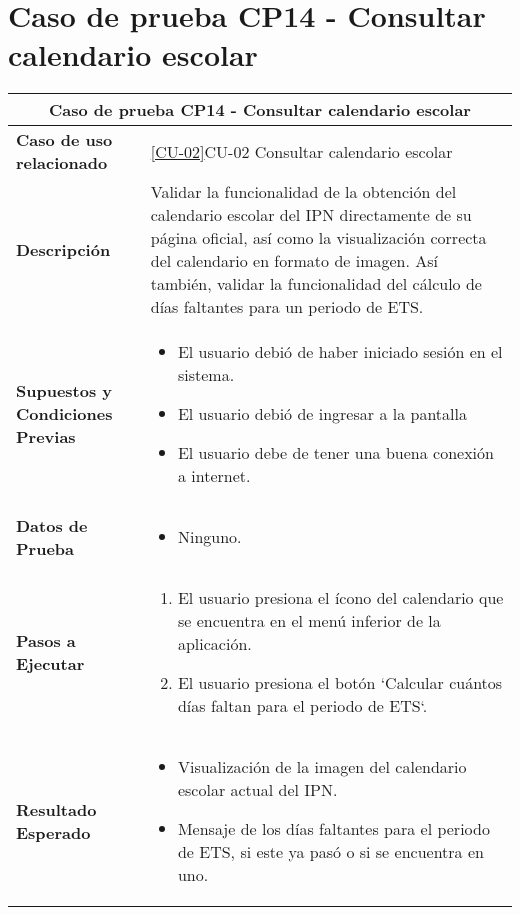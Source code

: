 
\section{Caso de prueba CP14 - Consultar calendario escolar}

\begin{longtable}{|p{5cm}|p{10cm}|}
	\hline
	\multicolumn{2}{|c|}{\textbf{Caso de prueba CP14 - Consultar calendario escolar}} \\
	\hline
	\textbf{Caso de uso relacionado} & \ref{CU-02}{CU-02} Consultar calendario escolar \\
	\hline
	\textbf{Descripción} & Validar la funcionalidad de la obtención del calendario escolar del IPN directamente de su página oficial, así como la visualización correcta del calendario en formato de imagen. Así también, validar la funcionalidad del cálculo de días faltantes para un periodo de ETS. \\
	\hline
	\textbf{Supuestos y Condiciones Previas} & 
	\begin{itemize}
		\item El usuario debió de haber iniciado sesión en el sistema.
		\item El usuario debió de ingresar a la pantalla \IUref{IU02}{Pantalla Consultar calendario escolar}
		\item El usuario debe de tener una buena conexión a internet.
	\end{itemize} \\
	\hline
	\textbf{Datos de Prueba} & 
	\begin{itemize}
		\item Ninguno.
	\end{itemize} \\
	\hline
	\textbf{Pasos a Ejecutar} & 
	\begin{enumerate}
		\item El usuario presiona el ícono del calendario que se encuentra en el menú inferior de la aplicación.
		\item El usuario presiona el botón `Calcular cuántos días faltan para el periodo de ETS`.
	\end{enumerate} \\
	\hline
	\textbf{Resultado Esperado} & 
	\begin{itemize}
		\item Visualización de la imagen del calendario escolar actual del IPN. 
		\item Mensaje de los días faltantes para el periodo de ETS, si este ya pasó o si se encuentra en uno.
	\end{itemize}

\end{longtable}

